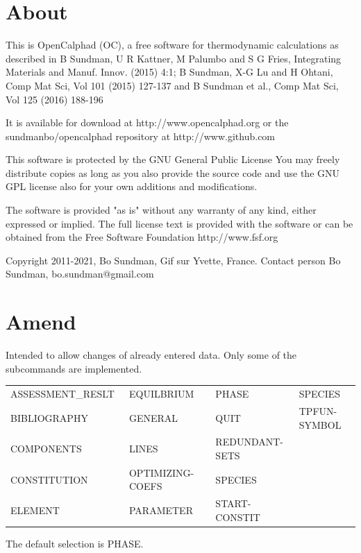 \documentclass[11pt]{article}
\begin{document}
\section{About}

This is OpenCalphad (OC), a free software for thermodynamic calculations as
described in B Sundman, U R Kattner, M Palumbo and S G Fries, Integrating
Materials and Manuf. Innov. (2015) 4:1; B Sundman, X-G Lu and H Ohtani,
Comp Mat Sci, Vol 101 (2015) 127-137 and B Sundman et al., Comp Mat Sci,
Vol 125 (2016) 188-196

It is available for download at http://www.opencalphad.org or
the sundmanbo/opencalphad repository at http://www.github.com

This software is protected by the GNU General Public License
You may freely distribute copies as long as you also provide the source code
and use the GNU GPL license also for your own additions and modifications.

The software is provided "as is" without any warranty of any kind, either
expressed or implied.  The full license text is provided with the software
or can be obtained from the Free Software Foundation http://www.fsf.org

Copyright 2011-2021, Bo Sundman, Gif sur Yvette, France.
Contact person Bo Sundman, bo.sundman@gmail.com

\hypertarget{Amend}{}
\section{Amend}

Intended to allow changes of already entered data. Only some
of the subcommands are implemented.

\begin{tabular}{llll}
 ASSESSMENT\_RESLT~ & EQUILBRIUM~ & PHASE         &  SPECIES\\
 BIBLIOGRAPHY~      & GENERAL     & QUIT~         & TPFUN-SYMBOL\\
 COMPONENTS         & LINES       & REDUNDANT-SETS   \\
 CONSTITUTION~      & OPTIMIZING-COEFS  & SPECIES \\           
 ELEMENT            & PARAMETER   & START-CONSTIT \\
\end{tabular}

The default selection is PHASE.
\end{document}
